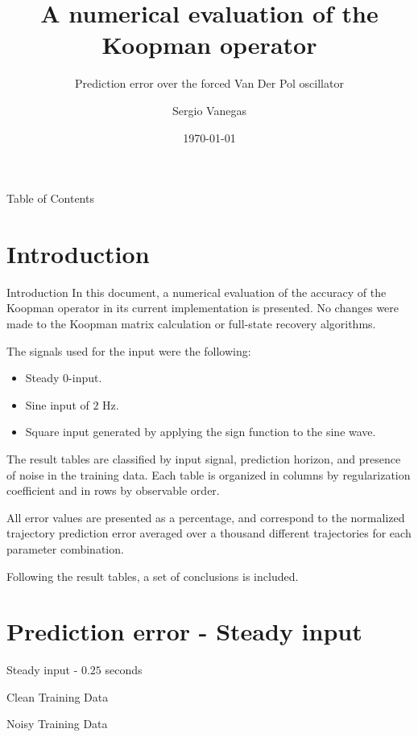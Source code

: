 \documentclass{beamer}
\title[Process]{A numerical evaluation of the Koopman operator}
\subtitle{Prediction error over the forced Van Der Pol oscillator}
\institute[Polimi]{Politecnico di Milano}
\author{Sergio Vanegas}
\date{\today}
\begin{document}
\begin{frame}
    \maketitle
\end{frame}

\begin{frame}{Table of Contents}
    \tableofcontents
\end{frame}


\section{Introduction}

\begin{frame}{Introduction}
    In this document, a numerical evaluation of the accuracy of the Koopman operator in its current implementation is presented. No changes were made to the Koopman matrix calculation or full-state recovery algorithms.

    The signals used for the input were the following:

    \begin{itemize}
        \item Steady 0-input.
        \item Sine input of $2$ Hz.
        \item Square input generated by  applying the sign function to the sine wave.
    \end{itemize}
    
    The result tables are classified by input signal, prediction horizon, and presence of noise in the training data. Each table is organized in columns by regularization coefficient and in rows by observable order. 
    
    All error values are presented as a percentage, and correspond to the normalized trajectory prediction error averaged over a thousand different trajectories for each parameter combination.

    Following the result tables, a set of conclusions is included.
\end{frame}


\section{Prediction error - Steady input}

\begin{frame}{Steady input - $0.25$ seconds}
    \scriptsize
    \begin{table}[!ht]
        \centering
        \caption{Clean Training Data}
    \end{table}

    \begin{table}[!ht]
        \centering
        \caption{Noisy Training Data}
    \end{table}
\end{frame}
\end{document}
